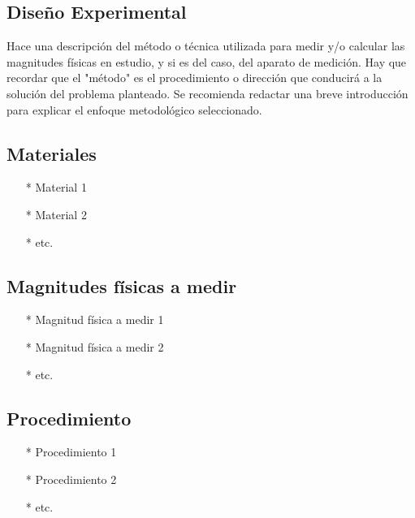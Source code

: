 \documentclass[osajnl,showpacs,superscriptaddress,10pt]{article}
\begin{document}
\begin{multicols}{2}
\section{Diseño Experimental}

    Hace una descripción del método o técnica utilizada para medir y/o calcular las magnitudes físicas en estudio, y si es del caso, del aparato de medición. Hay que recordar que el "método" es el procedimiento o dirección que conducirá a la solución del problema planteado. Se recomienda redactar una breve introducción para explicar el enfoque metodológico seleccionado.\\

\subsection{Materiales}

\begin{itemize}
    \item[*] Material 1
    \item[*] Material 2
    \item[*] etc.
\end{itemize}

\subsection{Magnitudes físicas a medir}

\begin{itemize}
    \item[*] Magnitud física a medir 1
    \item[*] Magnitud física a medir 2
    \item[*] etc.
\end{itemize}


\subsection{Procedimiento}

\begin{enumerate}
    \item[*] Procedimiento 1
    \item[*] Procedimiento 2
    \item[*] etc.
\end{enumerate}


\end{multicols}
\end{document}
